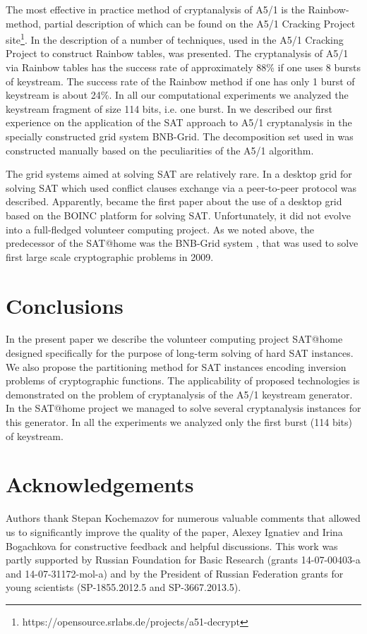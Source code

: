 \documentclass[runningheads,a4paper]{llncs}
\begin{document}
The most effective in practice method of cryptanalysis of A5/1 is the Rainbow-method, partial description of which can be found on the A5/1 Cracking Project site\footnote{https://opensource.srlabs.de/projects/a51-decrypt}. In \cite{Guneysu:2008:CC:1446228.1446266} the description of a number of techniques, used in the A5/1 Cracking Project to construct Rainbow tables, was presented. The cryptanalysis of A5/1 via Rainbow tables has the success rate of approximately 88\% if one uses 8 bursts of keystream. The success rate of the Rainbow method if one has only 1 burst of keystream is about 24\%. In all our computational experiments we analyzed the keystream fragment of size 114 bits, i.e. one burst. In \cite{DBLP:conf/pact/SemenovZBP11} we described our first experience on the application of the SAT approach to A5/1 cryptanalysis in the specially constructed grid system BNB-Grid. The decomposition set used in \cite{DBLP:conf/pact/SemenovZBP11} was constructed manually based on the peculiarities of the A5/1 algorithm.
 
The grid systems aimed at solving SAT are relatively rare. In \cite{DBLP:journals/grid/SchulzB10} a desktop grid for solving SAT which used conflict clauses exchange via a peer-to-peer protocol was described. Apparently, \cite{DBLP:conf/grid/BlackB11} became the first paper about the use of a desktop grid based on the BOINC platform for solving SAT. Unfortunately, it did not evolve into a full-fledged volunteer computing project. As we noted above, the predecessor of the SAT@home was the BNB-Grid system \cite{DBLP:journals/ife/EvtushenkoPS09,DBLP:conf/pact/SemenovZBP11}, that was used to solve first large scale cryptographic problems in 2009. 

\section{Conclusions}
In the present paper we describe the volunteer computing project SAT@home designed specifically for the purpose of long-term solving of hard SAT instances. We also propose the partitioning method for SAT instances encoding inversion problems of cryptographic functions. The applicability of proposed technologies is demonstrated on the problem of cryptanalysis of the A5/1 keystream generator. In the SAT@home project we managed to solve several cryptanalysis instances for this generator. In all the experiments we analyzed only the first burst (114 bits) of keystream.

\section{Acknowledgements}
Authors thank Stepan Kochemazov for numerous valuable comments that allowed us to significantly improve the quality of the paper, Alexey Ignatiev and Irina Bogachkova for constructive feedback and helpful discussions. This work was partly supported by Russian Foundation for Basic Research (grants 14-07-00403-a and 14-07-31172-mol-a) and by the President of Russian Federation grants for young scientists (SP-1855.2012.5 and SP-3667.2013.5).



\end{document}
